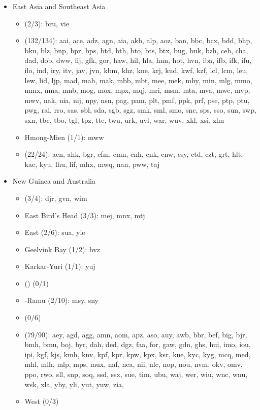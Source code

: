 \begin{itemize}[label={},leftmargin=0cm,labelindent=5pt,itemindent=0pt]
  \item East Asia and Southeast Asia
    \begin{itemize}[label={},leftmargin=!,labelindent=5pt,itemindent=-15pt]
  	\item {} (2/3): bru, vie
  	\item {} (132/134): aai, ace, adz, agn, aia, akb, alp, aoz, ban, bbc, bcx, bdd, bhp, bku, blz, bnp, bpr, bps, btd, bth, bto, bts, btx, bug, buk, bzh, ceb, cha, dad, dob, dww, fij, gfk, gor, haw, hil, hla, hnn, hot, hvn, iba, ifb, ifk, ifu, ilo, ind, iry, itv, jav, jvn, kbm, khz, kne, krj, kud, kwf, kzf, lcl, lcm, leu, lew, lid, ljp, mad, mah, mak, mbb, mbt, mee, mek, mhy, min, mlg, mmo, mmx, mna, mnb, mog, mox, mpx, mqj, mri, msm, mta, mva, mwc, mvp, mwv, nak, nia, nij, npy, nsn, pag, pam, plt, pmf, ppk, prf, pse, ptp, ptu, pwg, rai, rro, sas, sbl, sda, sgb, sgz, smk, sml, smo, snc, sps, sso, sun, swp, sxn, tbc, tbo, tgl, tpz, tte, twu, urk, uvl, war, wuv, xkl, xsi, zlm
  	\item Hmong-Mien (1/1): mww
  	\item {} (22/24): acn, ahk, bgr, cfm, cmn, cnh, cnk, cnw, csy, ctd, czt, grt, hlt, kac, kyu, lhu, lif, mhx, mwq, nan, pww, taj
    \end{itemize}

  \item New Guinea and Australia
    \begin{itemize}[label={},leftmargin=!,labelindent=5pt,itemindent=-15pt]
  	\item {} (3/4): djr, gvn, wim
  	\item East Bird's Head (3/3): mej, mnx, mtj
  	\item East  (2/6): sua, yle
  	\item Geelvink Bay (1/2): bvz
  	\item Karkar-Yuri (1/1): yuj
  	\item {} () (0/1)
  	\item {}-Ramu (2/10): msy, sny
  	\item {} (0/6)
  	\item {} (79/90): aey, agd, agg, amn, aom, apz, aso, auy, awb, bbr, bef, big, bjr, bmh, bmu, boj, byr, dah, ded, dgz, faa, for, gaw, gdn, ghs, hui, imo, iou, ipi, kgf, kjs, kmh, knv, kpf, kpr, kpw, kpx, ksr, kue, kyc, kyg, mcq, med, mhl, mlh, mlp, mps, mux, naf, nca, nii, nlc, nop, nou, nvm, okv, omv, ppo, rwo, sll, snp, soq, ssd, ssx, sue, tim, ubu, waj, wer, wiu, wnc, wnu, wsk, xla, yby, yli, yut, yuw, zia,
  	\item West  (0/3)
    \end{itemize}


\end{itemize}
